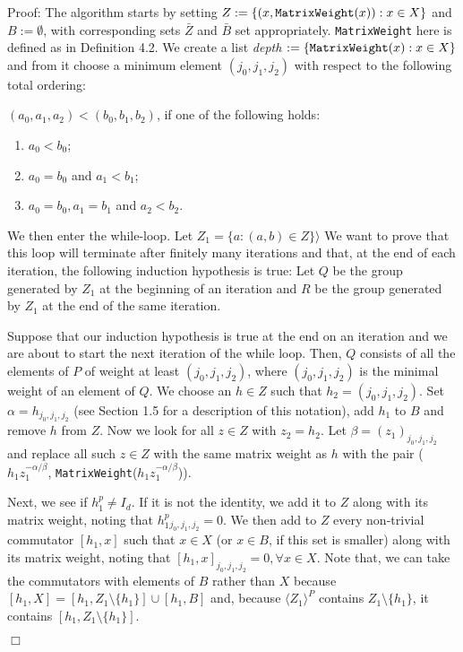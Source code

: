 \documentclass[12pt]{article}
\newenvironment{proof}{\normalsize {\sc Proof}:}{{\hfill $\Box$ \\}}
\begin{document}
\begin{proof}
The algorithm starts by setting $Z := \{(x, {\tt MatrixWeight}(x)) : x \in X\}$ and $B := \emptyset$, with corresponding sets $\bar{Z}$ and $\bar{B}$ set appropriately. {\tt MatrixWeight} here is defined as in Definition 4.2. We create a list \textit{depth} $:= \{{\tt MatrixWeight}(x) : x \in X\}$ and from it choose a minimum element $(j_0, j_1, j_2)$ with respect to the following total ordering:

$(a_0, a_1, a_2) < (b_0, b_1, b_2)$, if one of the following holds:

\begin{enumerate}
\item $a_0 < b_0$;
\item $a_0 = b_0$ and $a_1 < b_1$; 
\item $a_0 = b_0, a_1 = b_1$ and $a_2 < b_2$.
\end{enumerate}

We then enter the while-loop. Let $Z_1 = \{a : (a, b) \in Z \} \rangle$  We want to prove that this loop will terminate after finitely many iterations and that, at the end of each iteration, the following induction hypothesis is true: Let $Q$ be the group generated by $Z_1$ at the beginning of an iteration and $R$ be the group generated by $Z_1$ at the end of the same iteration.

Suppose that our induction hypothesis is true at the end on an iteration and we are about to start the next iteration of the while loop. Then, $Q$ consists of all the elements of $P$ of weight at least $(j_0, j_1, j_2)$, where $(j_0, j_1, j_2)$ is the minimal weight of an element of $Q$. We choose an $h \in Z$ such that $h_2 = (j_0, j_1, j_2)$. Set $\alpha = h_{j_0, j_1, j_2}$ (see Section 1.5 for a description of this notation), add $h_1$ to $B$ and remove $h$ from $Z$. Now we look for all $z \in Z$ with $z_2 = h_2$. Let $\beta = (z_1)_{j_0, j_1, j_2}$ and replace all such $z \in Z$ with the same matrix weight as $h$ with the pair ($h_1 z_1^{-\alpha / \beta}$, {\tt MatrixWeight}($h_1 z_1^{-\alpha / \beta}$)).

Next, we see if $h_1^p \ne I_d$. If it is not the identity, we add it to $Z$ along with its matrix weight, noting that $h_1^p _{j_0, j_1, j_2} = 0$. We then add to $Z$ every non-trivial commutator $[h_1, x]$ such that $x \in X$ (or $x \in B$, if this set is smaller) along with its matrix weight, noting that $[h_1, x] _{j_0, j_1, j_2} = 0, \forall x \in X$. Note that, we can take the commutators with elements of $B$ rather than $X$ because $[h_1 ,X] = [h_1, Z_1 \setminus \{h_1\}] \cup [h_1, B]$ and, because $\langle Z_1 \rangle ^P$ contains $Z_1 \setminus \{h_1\}$, it contains $[h_1, Z_1 \setminus \{h_1\}]$.


\end{proof}
\end{document}
